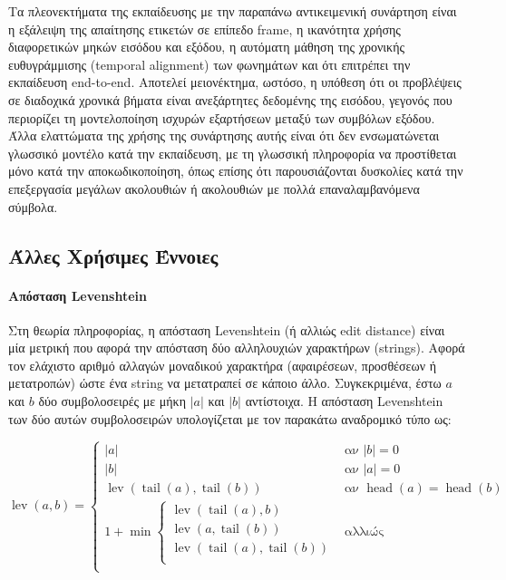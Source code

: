 Τα πλεονεκτήματα της εκπαίδευσης με την παραπάνω αντικειμενική συνάρτηση είναι η εξάλειψη της απαίτησης ετικετών σε επίπεδο frame, η ικανότητα χρήσης διαφορετικών μηκών εισόδου και εξόδου, η αυτόματη μάθηση της χρονικής ευθυγράμμισης (temporal alignment) των φωνημάτων και ότι επιτρέπει την εκπαίδευση end-to-end. Αποτελεί μειονέκτημα, ωστόσο, η υπόθεση ότι οι προβλέψεις σε διαδοχικά χρονικά βήματα είναι ανεξάρτητες δεδομένης της εισόδου, γεγονός που περιορίζει τη μοντελοποίηση ισχυρών εξαρτήσεων μεταξύ των συμβόλων εξόδου. Άλλα ελαττώματα της χρήσης της συνάρτησης αυτής είναι ότι δεν ενσωματώνεται γλωσσικό μοντέλο κατά την εκπαίδευση, με τη γλωσσική πληροφορία να προστίθεται μόνο κατά την αποκωδικοποίηση, όπως επίσης ότι παρουσιάζονται δυσκολίες κατά την επεξεργασία μεγάλων ακολουθιών ή ακολουθιών με πολλά επαναλαμβανόμενα σύμβολα.

\subsection{Άλλες Χρήσιμες Έννοιες}
\label{OtherBackground}
\paragraph{Απόσταση Levenshtein}

Στη θεωρία πληροφορίας, η απόσταση Levenshtein (ή αλλιώς edit distance) είναι μία μετρική που αφορά την απόσταση δύο αλληλουχιών χαρακτήρων (strings). Αφορά τον ελάχιστο αριθμό αλλαγών μοναδικού χαρακτήρα (αφαιρέσεων, προσθέσεων ή μετατροπών) ώστε ένα string να μετατραπεί σε κάποιο άλλο. Συγκεκριμένα, έστω $a$ και $b$ δύο συμβολοσειρές με μήκη $|a|$ και $|b|$ αντίστοιχα. Η απόσταση Levenshtein των δύο αυτών συμβολοσειρών υπολογίζεται με τον παρακάτω αναδρομικό τύπο ως:

\[
\operatorname{lev}(a,b) = \begin{cases}
|a| & \text{αν } |b| = 0 \\
|b| & \text{αν } |a| = 0 \\
\operatorname{lev}(\operatorname{tail}(a), \operatorname{tail}(b)) & \text{αν } \operatorname{head}(a) = \operatorname{head}(b) \\
1 + \min \begin{cases}  \operatorname{lev}(\operatorname{tail}(a),b) \\
								\operatorname{lev}(a,\operatorname{tail}(b)) \\
								\operatorname{lev}(\operatorname{tail}(a),\operatorname{tail}(b)) \\
			\end{cases} & \text{αλλιώς} \\
			\end{cases}
\]

